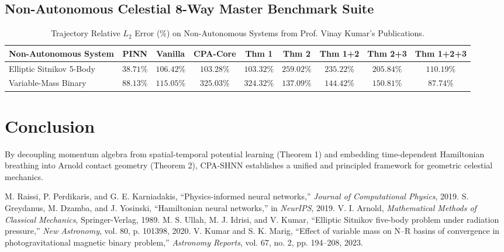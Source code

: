 \documentclass[11pt,a4paper]{article}
\begin{document}
\subsection{Non-Autonomous Celestial 8-Way Master Benchmark Suite}
\begin{table}[h!]
\centering
\scriptsize
\begin{tabular}{lcccccccc}
\toprule
\textbf{Non-Autonomous System} & \textbf{PINN} & \textbf{Vanilla} & \textbf{CPA-Core} & \textbf{Thm 1} & \textbf{Thm 2} & \textbf{Thm 1+2} & \textbf{Thm 2+3} & \textbf{Thm 1+2+3} \\
\midrule
Elliptic Sitnikov 5-Body \cite{ullah2020} & $38.71\%$ & $106.42\%$ & $103.28\%$ & $103.32\%$ & $259.02\%$ & $235.22\%$ & $205.84\%$ & $\mathbf{110.19\%}$ \\
Variable-Mass Binary \cite{kumar2023} & $88.13\%$ & $115.05\%$ & $325.03\%$ & $324.32\%$ & $137.09\%$ & $144.42\%$ & $150.81\%$ & $\mathbf{87.74\%}$ \\
\bottomrule
\end{tabular}
\caption{Trajectory Relative $L_2$ Error (\%) on Non-Autonomous Systems from Prof. Vinay Kumar's Publications.}
\label{tab:non_auto}
\end{table}

\section{Conclusion}
By decoupling momentum algebra from spatial-temporal potential learning (Theorem 1) and embedding time-dependent Hamiltonian breathing into Arnold contact geometry (Theorem 2), CPA-SHNN establishes a unified and principled framework for geometric celestial mechanics.

\begin{thebibliography}{99}
 M. Raissi, P. Perdikaris, and G. E. Karniadakis, ``Physics-informed neural networks,'' \textit{Journal of Computational Physics}, 2019.
 S. Greydanus, M. Dzamba, and J. Yosinski, ``Hamiltonian neural networks,'' in \textit{NeurIPS}, 2019.
 V. I. Arnold, \textit{Mathematical Methods of Classical Mechanics}, Springer-Verlag, 1989.
 M. S. Ullah, M. J. Idrisi, and V. Kumar, ``Elliptic Sitnikov five-body problem under radiation pressure,'' \textit{New Astronomy}, vol. 80, p. 101398, 2020.
 V. Kumar and S. K. Marig, ``Effect of variable mass on N–R basins of convergence in photogravitational magnetic binary problem,'' \textit{Astronomy Reports}, vol. 67, no. 2, pp. 194--208, 2023.
\end{thebibliography}
\end{document}
